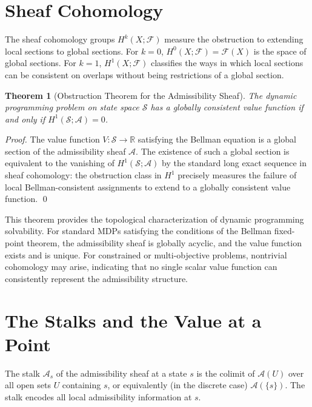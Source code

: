 \documentclass[12pt, a4paper, openany]{book}
\theoremstyle{plain}
\newtheorem{theorem}{Theorem}[chapter]
\theoremstyle{definition}
\theoremstyle{remark}
\begin{document}
\section{Sheaf Cohomology}

The sheaf cohomology groups $H^k(X; \mathcal{F})$ measure the obstruction to extending local sections to global sections. For $k=0$, $H^0(X; \mathcal{F}) = \mathcal{F}(X)$ is the space of global sections. For $k=1$, $H^1(X; \mathcal{F})$ classifies the ways in which local sections can be consistent on overlaps without being restrictions of a global section.

\begin{theorem}[Obstruction Theorem for the Admissibility Sheaf]
The dynamic programming problem on state space $\mathcal{S}$ has a globally consistent value function if and only if $H^1(\mathcal{S}; \mathcal{A}) = 0$.
\end{theorem}

\begin{proof}
The value function $V: \mathcal{S} \to \mathbb{R}$ satisfying the Bellman equation is a global section of the admissibility sheaf $\mathcal{A}$. The existence of such a global section is equivalent to the vanishing of $H^1(\mathcal{S}; \mathcal{A})$ by the standard long exact sequence in sheaf cohomology: the obstruction class in $H^1$ precisely measures the failure of local Bellman-consistent assignments to extend to a globally consistent value function. \qed
\end{proof}

This theorem provides the topological characterization of dynamic programming solvability. For standard MDPs satisfying the conditions of the Bellman fixed-point theorem, the admissibility sheaf is globally acyclic, and the value function exists and is unique. For constrained or multi-objective problems, nontrivial cohomology may arise, indicating that no single scalar value function can consistently represent the admissibility structure.

\section{The Stalks and the Value at a Point}

The stalk $\mathcal{A}_s$ of the admissibility sheaf at a state $s$ is the colimit of $\mathcal{A}(U)$ over all open sets $U$ containing $s$, or equivalently (in the discrete case) $\mathcal{A}(\{s\})$. The stalk encodes all local admissibility information at $s$.
\end{document}
